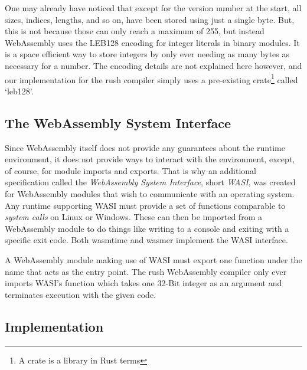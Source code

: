 One may already have noticed that except for the version number at the start, all sizes, indices, lengths, and so on, have been stored using just a single byte.
But, this is not because those can only reach a maximum of 255, but instead WebAssembly uses the LEB128 encoding for integer literals in binary modules.
It is a space efficient way to store integers by only ever needing as many bytes as necessary for a number.
The encoding details are not explained here however, and our implementation for the rush compiler simply uses a pre-existing crate\footnote{A crate is a library in Rust terms} called `leb128'.


\subsection{The WebAssembly System Interface}

Since WebAssembly itself does not provide any guarantees about the runtime environment, it does not provide ways to interact with the environment, except, of course, for module imports and exports.
That is why an additional specification called the \emph{WebAssembly System Interface}, short \emph{WASI}, was created for WebAssembly modules that wish to communicate with an operating system.
Any runtime supporting WASI must provide a set of functions comparable to \emph{system calls} on Linux or Windows.
These can then be imported from a WebAssembly module to do things like writing to a console and exiting with a specific exit code.
Both wasmtime and wasmer implement the WASI interface.

A WebAssembly module making use of WASI must export one function under the name  that acts as the entry point.
The rush WebAssembly compiler only ever imports WASI's  function which takes one 32-Bit integer as an argument and terminates execution with the given code.


\subsection{Implementation}


